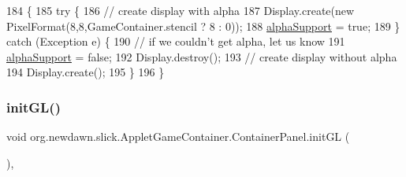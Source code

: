 \begin{DoxyCode}
184                                                     \{
185          \textcolor{keywordflow}{try} \{
186             \textcolor{comment}{// create display with alpha}
187             Display.create(\textcolor{keyword}{new} PixelFormat(8,8,GameContainer.stencil ? 8 : 0));
188             \mbox{\hyperlink{classorg_1_1newdawn_1_1slick_1_1_applet_game_container_a975d5cbb1d3d12649282b6ab406dafce}{alphaSupport}} = \textcolor{keyword}{true};
189          \} \textcolor{keywordflow}{catch} (Exception e) \{
190             \textcolor{comment}{// if we couldn't get alpha, let us know}
191             \mbox{\hyperlink{classorg_1_1newdawn_1_1slick_1_1_applet_game_container_a975d5cbb1d3d12649282b6ab406dafce}{alphaSupport}} = \textcolor{keyword}{false};
192              Display.destroy();
193              \textcolor{comment}{// create display without alpha}
194             Display.create();
195          \}
196       \}
\end{DoxyCode}
\mbox{\label{classorg_1_1newdawn_1_1slick_1_1_applet_game_container_1_1_container_panel_a4b658282611744354185e5adef954b53}} 
\subsubsection{\texorpdfstring{init\+G\+L()}{initGL()}}
{\footnotesize\ttfamily void org.\+newdawn.\+slick.\+Applet\+Game\+Container.\+Container\+Panel.\+init\+GL (\begin{DoxyParamCaption}{ }\end{DoxyParamCaption})\hspace{0.3cm}{\ttfamily [inline]}, {\ttfamily [protected]}}

